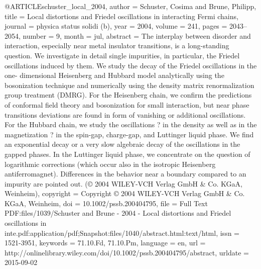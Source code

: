 @ARTICLE{schuster_local_2004,
  author = {Schuster, Cosima and Brune, Philipp},
  title = {Local distortions and {Friedel} oscillations in interacting {Fermi}
	chains},
  journal = {physica status solidi (b)},
  year = {2004},
  volume = {241},
  pages = {2043--2054},
  number = {9},
  month = jul,
  abstract = {The interplay between disorder and interaction, especially near metal
	insulator transitions, is a long-standing question. We investigate
	in detail single impurities, in particular, the Friedel oscillations
	induced by them. We study the decay of the Friedel oscillations in
	the one- dimensional Heisenberg and Hubbard model analytically using
	the bosonization technique and numerically using the density matrix
	renormalization group treatment (DMRG). For the Heisenberg chain,
	we confirm the predictions of conformal field theory and bosonization
	for small interaction, but near phase transitions deviations are
	found in form of vanishing or additional oscillations. For the Hubbard
	chain, we study the oscillations ? in the density as well as in the
	magnetization ? in the spin-gap, charge-gap, and Luttinger liquid
	phase. We find an exponential decay or a very slow algebraic decay
	of the oscillations in the gapped phases. In the Luttinger liquid
	phase, we concentrate on the question of logarithmic corrections
	(which occur also in the isotropic Heisenberg antiferromagnet). Differences
	in the behavior near a boundary compared to an impurity are pointed
	out. (© 2004 WILEY-VCH Verlag GmbH \& Co. KGaA, Weinheim)},
  copyright = {Copyright © 2004 WILEY-VCH Verlag GmbH \& Co. KGaA, Weinheim},
  doi = {10.1002/pssb.200404795},
  file = {Full Text PDF:files/1039/Schuster and Brune - 2004 - Local distortions and Friedel            oscillations in inte.pdf:application/pdf;Snapshot:files/1040/abstract.html:text/html},
  issn = {1521-3951},
  keywords = {71.10.Fd, 71.10.Pm},
  language = {en},
  url = {http://onlinelibrary.wiley.com/doi/10.1002/pssb.200404795/abstract},
  urldate = {2015-09-02}
}

